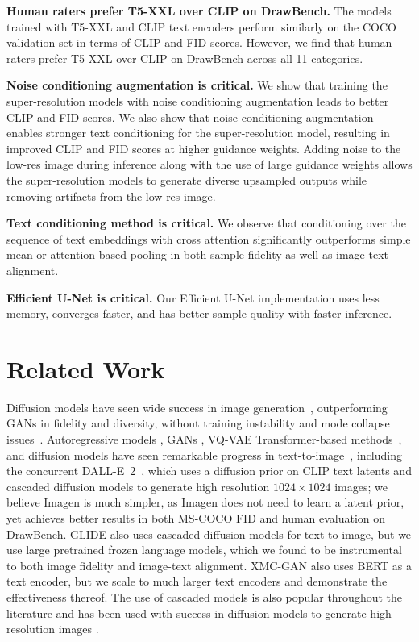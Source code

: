 \textbf{Human raters prefer T5-XXL over CLIP on DrawBench.} The models trained with T5-XXL and CLIP text encoders perform similarly on the COCO validation set in terms of CLIP and FID scores. However, we find that human raters prefer T5-XXL over CLIP on DrawBench across all 11 categories.

\textbf{Noise conditioning augmentation is critical.} We show that training the super-resolution models with noise conditioning augmentation leads to better CLIP and FID scores. We also show that noise conditioning augmentation enables stronger text conditioning for the super-resolution model, resulting in improved CLIP and FID scores at higher guidance weights. Adding noise to the low-res image during inference along with the use of large guidance weights allows the super-resolution models to generate diverse upsampled outputs while removing artifacts from the low-res image.

\textbf{Text conditioning method is critical.} We observe that conditioning over the sequence of text embeddings with cross attention significantly outperforms simple mean or attention based pooling in both sample fidelity as well as image-text alignment.

\textbf{Efficient U-Net is critical.} Our Efficient U-Net implementation uses less memory, converges faster, and has better sample quality with faster inference.

\section{Related Work}

Diffusion models have seen wide success in image generation~\cite{ho2020denoising,nichol2021improved,saharia2021image,dhariwal2021diffusion,ho2021cascaded,sahariac-palette}, outperforming GANs in fidelity and diversity, without training instability and mode collapse issues~\cite{brock2018large,dhariwal2021diffusion,ho2021cascaded}. Autoregressive models \cite{mansimov-iclr-2016}, GANs \cite{xu-cvpr-2018,zhang2021cross}, VQ-VAE Transformer-based methods~\cite{ramesh-dalle,gafni2022make}, and diffusion models have seen remarkable progress in text-to-image~\cite{rombach-cvpr-2022,nichol-glide,rombach-cvpr-2022}, including the concurrent \mbox{DALL-E 2}~\cite{ramesh-dalle2}, which uses a diffusion prior on CLIP text latents and cascaded diffusion models to generate high resolution $1024\times1024$ images; we believe Imagen is much simpler, as Imagen does not need to learn a latent prior, yet achieves better results in both MS-COCO FID and human evaluation on DrawBench. GLIDE \cite{nichol-glide} also uses cascaded diffusion models for text-to-image, but we use large pretrained frozen language models, which we found to be instrumental to both image fidelity and image-text alignment. XMC-GAN \cite{zhang2021cross} also uses BERT as a text encoder, but we scale to much larger text encoders and demonstrate the effectiveness thereof. The use of cascaded models is also popular throughout the literature \cite{denton-nips-2015,menick-iclr-2019} and has been used with success in diffusion models to generate high resolution images \cite{dhariwal2021diffusion,ho2021cascaded}. 

